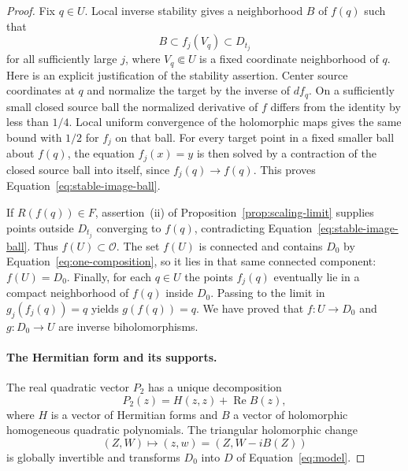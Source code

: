 \begin{proof}
Fix $q\in U$.  Local inverse stability gives a neighborhood $B$ of $f(q)$
such that
\begin{equation}
\label{eq:stable-image-ball}
 B\subset f_j(V_q)\subset D_{t_j}
\end{equation}
for all sufficiently large $j$, where $V_q\Subset U$ is a fixed
coordinate neighborhood of $q$.  Here is an explicit justification of
the stability assertion.  Center source coordinates at $q$ and normalize
the target by the inverse of $df_q$.  On a sufficiently small closed
source ball the normalized derivative of $f$ differs from the identity
by less than $1/4$.  Local uniform convergence of the holomorphic maps
gives the same bound with $1/2$ for $f_j$ on that ball.  For every target
point in a fixed smaller ball about $f(q)$, the equation $f_j(x)=y$ is
then solved by a contraction of the closed source ball into itself,
since $f_j(q)\to f(q)$.  This proves
Equation~\eqref{eq:stable-image-ball}.

If $R(f(q))\in F$, assertion~\textup{(ii)} of
Proposition~\ref{prop:scaling-limit} supplies points outside $D_{t_j}$
converging to $f(q)$, contradicting
Equation~\eqref{eq:stable-image-ball}.  Thus $f(U)\subset\mathcal O$.
The set $f(U)$ is connected and contains $D_0$ by
Equation~\eqref{eq:one-composition}, so it lies in that same connected
component: $f(U)=D_0$.  Finally, for each $q\in U$ the points $f_j(q)$
eventually lie in a compact neighborhood of $f(q)$ inside $D_0$.
Passing to the limit in $g_j(f_j(q))=q$ yields $g(f(q))=q$.  We have proved
that $f:U\to D_0$ and $g:D_0\to U$ are inverse biholomorphisms.

\paragraph{The Hermitian form and its supports.}
The real quadratic vector $P_2$ has a unique decomposition
\[
 P_2(z)=H(z,z)+\operatorname{Re}B(z),
\]
where $H$ is a vector of Hermitian forms and $B$ a vector of holomorphic
homogeneous quadratic polynomials.  The triangular holomorphic change
\[
 (Z,W)\longmapsto(z,w)=(Z,W-iB(Z))
\]
is globally invertible and transforms $D_0$ into $D$ of
Equation~\eqref{eq:model}.


\end{proof}
